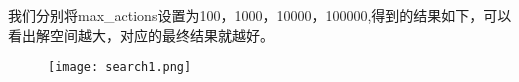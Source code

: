 \documentclass[UTF8]{ctexart}
\begin{document}
我们分别将max\_actions设置为100，1000，10000，100000,得到的结果如下，可以看出解空间越大，对应的最终结果就越好。


\begin{figure}[H]
    \centering
    \texttt{[image: search1.png]}
    
    \caption{}
    \label{fig:search}
\end{figure}\par
\end{document}
